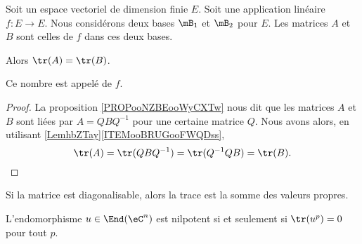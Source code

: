 \begin{propositionDef}	\label{PROPooSQLOooCbTQOC}
	Soit un espace vectoriel de dimension finie \( E\). Soit une application linéaire \(f \colon E\to E  \). Nous considérons deux bases \( \mB_1\) et \( \mB_2\) pour \( E\). Les matrices \( A\) et \( B\) sont celles de \( f\) dans ces  deux bases.

	Alors \( \tr(A)=\tr(B)\).

	Ce nombre est appelé  de \( f\).
\end{propositionDef}

\begin{proof}
	La proposition \ref{PROPooNZBEooWyCXTw} nous dit que les matrices \( A\)  et \( B\) sont liées par \( A=QBQ^{-1}\) pour une certaine matrice \( Q\). Nous avons alors, en utilisant \ref{LemhbZTay}\ref{ITEMooBRUGooFWQDss},
	\begin{equation}
		\tr(A)=\tr(QBQ^{-1})=\tr(Q^{-1}QB)=\tr(B).
	\end{equation}
\end{proof}


\begin{proposition}	\label{PROPooLSBZooKGfeFI}
	Si la matrice est diagonalisable, alors la trace est la somme des valeurs propres.
\end{proposition}


\begin{lemma}   \label{LemzgNOjY}
	L'endomorphisme \( u\in\End(\eC^n)\) est nilpotent si et seulement si \( \tr(u^p)=0\) pour tout \( p\).
\end{lemma}

